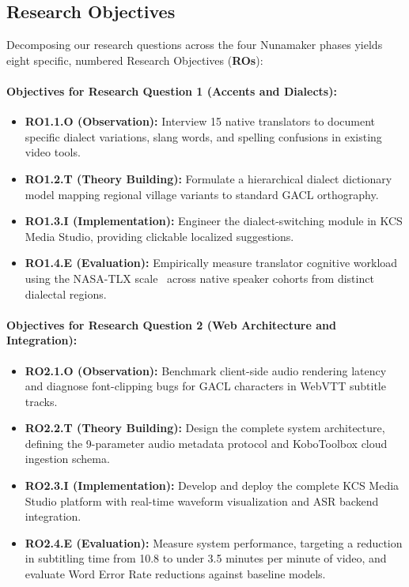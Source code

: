 \documentclass[a4paper,11pt]{article}
\begin{document}
\subsection{Research Objectives}
\label{sec:chap1_research_objectives}

Decomposing our research questions across the four Nunamaker phases yields eight specific, numbered Research Objectives (\textbf{ROs}):

\paragraph{Objectives for Research Question 1 (Accents and Dialects):}
\begin{itemize}
    \item \textbf{RO1.1.O (Observation):} Interview 15 native translators to document specific dialect variations, slang words, and spelling confusions in existing video tools.
    \item \textbf{RO1.2.T (Theory Building):} Formulate a hierarchical dialect dictionary model mapping regional village variants to standard GACL orthography.
    \item \textbf{RO1.3.I (Implementation):} Engineer the dialect-switching module in KCS Media Studio, providing clickable localized suggestions.
    \item \textbf{RO1.4.E (Evaluation):} Empirically measure translator cognitive workload using the NASA-TLX scale~\cite{hart1988nasa} across native speaker cohorts from distinct dialectal regions.
\end{itemize}

\paragraph{Objectives for Research Question 2 (Web Architecture and Integration):}
\begin{itemize}
    \item \textbf{RO2.1.O (Observation):} Benchmark client-side audio rendering latency and diagnose font-clipping bugs for GACL characters in WebVTT subtitle tracks.
    \item \textbf{RO2.2.T (Theory Building):} Design the complete system architecture, defining the 9-parameter audio metadata protocol and KoboToolbox cloud ingestion schema.
    \item \textbf{RO2.3.I (Implementation):} Develop and deploy the complete KCS Media Studio platform with real-time waveform visualization and ASR backend integration.
    \item \textbf{RO2.4.E (Evaluation):} Measure system performance, targeting a reduction in subtitling time from 10.8 to under 3.5 minutes per minute of video, and evaluate Word Error Rate reductions against baseline models.
\end{itemize}
\end{document}
